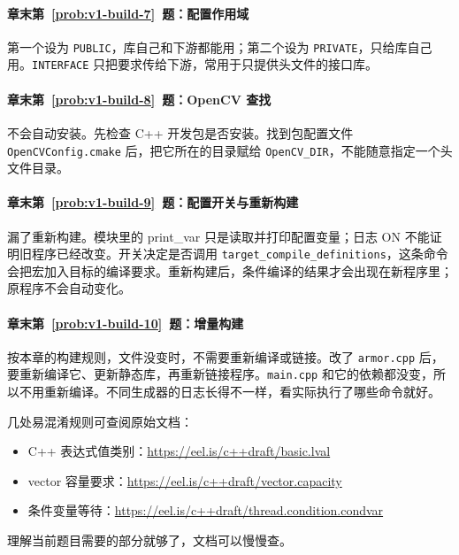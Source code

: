\paragraph*{章末第~\ref{prob:v1-build-7}~题：配置作用域}
\begin{solution}
第一个设为 \texttt{PUBLIC}，库自己和下游都能用；第二个设为 \texttt{PRIVATE}，只给库自己用。\texttt{INTERFACE} 只把要求传给下游，常用于只提供头文件的接口库。
\end{solution}

\paragraph*{章末第~\ref{prob:v1-build-8}~题：OpenCV 查找}
\begin{solution}
不会自动安装。先检查 C++ 开发包是否安装。找到包配置文件 \texttt{OpenCVConfig.cmake} 后，把它所在的目录赋给 \texttt{OpenCV\_DIR}，不能随意指定一个头文件目录。
\end{solution}

\paragraph*{章末第~\ref{prob:v1-build-9}~题：配置开关与重新构建}
\begin{solution}
漏了重新构建。模块里的 print\_var 只是读取并打印配置变量；日志 ON 不能证明旧程序已经改变。开关决定是否调用 \texttt{target\_compile\_definitions}，这条命令会把宏加入目标的编译要求。重新构建后，条件编译的结果才会出现在新程序里；原程序不会自动变化。
\end{solution}

\paragraph*{章末第~\ref{prob:v1-build-10}~题：增量构建}
\begin{solution}
按本章的构建规则，文件没变时，不需要重新编译或链接。改了 \texttt{armor.cpp} 后，要重新编译它、更新静态库，再重新链接程序。\texttt{main.cpp} 和它的依赖都没变，所以不用重新编译。不同生成器的日志长得不一样，看实际执行了哪些命令就好。
\end{solution}

\begin{note}
几处易混淆规则可查阅原始文档：
\begin{itemize}
    \item C++ 表达式值类别：\url{https://eel.is/c++draft/basic.lval}
    \item vector 容量要求：\url{https://eel.is/c++draft/vector.capacity}
    \item 条件变量等待：\url{https://eel.is/c++draft/thread.condition.condvar}
\end{itemize}
理解当前题目需要的部分就够了，文档可以慢慢查。
\end{note}

